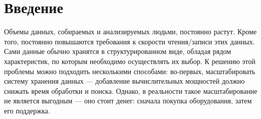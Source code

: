 \chapter*{Введение}							%

\newcommand{\actuality}{}
\newcommand{\progress}{}
\newcommand{\aim}{{\textbf\aimTXT}}
\newcommand{\tasks}{\textbf{\tasksTXT}}
\newcommand{\novelty}{\textbf{\noveltyTXT}}
\newcommand{\influence}{\textbf{\influenceTXT}}
\newcommand{\methods}{\textbf{\methodsTXT}}
\newcommand{\defpositions}{\textbf{\defpositionsTXT}}
\newcommand{\reliability}{\textbf{\reliabilityTXT}}
\newcommand{\probation}{\textbf{\probationTXT}}
\newcommand{\contribution}{\textbf{\contributionTXT}}
\newcommand{\publications}{\textbf{\publicationsTXT}}


%

Объемы данных, собираемых и анализируемых людьми, постоянно растут. 
Кроме того, постоянно повышаются требования к скорости чтения/записи этих
данных. Сами данные обычно хранятся в структурированном виде, обладая
рядом характеристик, по которым необходимо осуществлять их выбор.
К решению этой проблемы можно подходить несколькими способами: во-первых,
масштабировать систему хранения данных --- добавление вычислительных
мощностей должно снижать время обработки и поиска. Однако, в реальности такое
масштабирование не является выгодным --- оно стоит денег: сначала покупка
оборудования, затем его поддержка.

